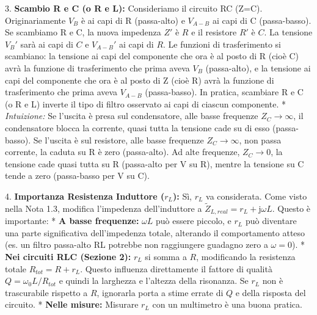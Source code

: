 \documentclass[a4paper, 11pt]{article}
\newcommand{\jj}{\mathrm{j}} %
\begin{document}
3.  \textbf{Scambio R e C (o R e L):} Consideriamo il circuito RC (Z=C). Originariamente $V_B$ è ai capi di R (passa-alto) e $V_{A-B}$ ai capi di C (passa-basso). Se scambiamo R e C, la nuova impedenza $Z'$ è $R$ e il resistore $R'$ è $C$. La tensione $V_B'$ sarà ai capi di $C$ e $V_{A-B}'$ ai capi di $R$. Le funzioni di trasferimento si scambiano: la tensione ai capi del componente che ora è al posto di R (cioè C) avrà la funzione di trasferimento che prima aveva $V_B$ (passa-alto), e la tensione ai capi del componente che ora è al posto di Z (cioè R) avrà la funzione di trasferimento che prima aveva $V_{A-B}$ (passa-basso). In pratica, scambiare R e C (o R e L) inverte il tipo di filtro osservato ai capi di ciascun componente.
    *   \textit{Intuizione:} Se l'uscita è presa sul condensatore, alle basse frequenze $Z_C \to \infty$, il condensatore blocca la corrente, quasi tutta la tensione cade su di esso (passa-basso). Se l'uscita è sul resistore, alle basse frequenze $Z_C \to \infty$, non passa corrente, la caduta su R è zero (passa-alto). Ad alte frequenze, $Z_C \to 0$, la tensione cade quasi tutta su R (passa-alto per V su R), mentre la tensione su C tende a zero (passa-basso per V su C).

4.  \textbf{Importanza Resistenza Induttore ($r_L$):} Sì, $r_L$ va considerata. Come visto nella Nota 1.3, modifica l'impedenza dell'induttore a $\tilde{Z}_{L,real} = r_L + \jj \omega L$. Questo è importante:
    *   \textbf{A basse frequenze:} $\omega L$ può essere piccolo, e $r_L$ può diventare una parte significativa dell'impedenza totale, alterando il comportamento atteso (es. un filtro passa-alto RL potrebbe non raggiungere guadagno zero a $\omega=0$).
    *   \textbf{Nei circuiti RLC (Sezione 2):} $r_L$ si somma a $R$, modificando la resistenza totale $R_{tot} = R + r_L$. Questo influenza direttamente il fattore di qualità $Q = \omega_0 L / R_{tot}$ e quindi la larghezza e l'altezza della risonanza. Se $r_L$ non è trascurabile rispetto a $R$, ignorarla porta a stime errate di $Q$ e della risposta del circuito.
    *   \textbf{Nelle misure:} Misurare $r_L$ con un multimetro è una buona pratica.
\end{document}

